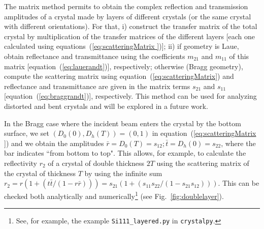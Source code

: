 \documentclass[preprint]{iucr}              %
\newcommand{\todo}[1]{{\color{red}[TODO: "#1'']}}
\newcommand{\inblue}[1]{{\color{blue}#1}}
\newcommand{\inred}[1]{{\color{red}#1}}
\begin{document}

\inblue{
The matrix method permits to obtain the complex reflection and transmission amplitudes of a crystal made by layers of different crystals (or the same crystal with different orientations). For that,
i) construct the transfer matrix of the total crystal by multiplication of the transfer matrices of the different layers [each one calculated using equations~(\ref{eq:scatteringMatrix })];
ii) if geometry is Laue, obtain reflectance and transmittance using the coefficients $m_{21}$ and $m_{11}$ of this matrix [equation~(\ref{eq:lauerandt})], respectively; otherwise (Bragg geometry), compute the scattering matrix using equation~(\ref{eq:scatteringMatrix}) and reflectance and transmittance are given in the matrix terms $s_{21}$ and $s_{11}$ [equation~(\ref{eq:braggrandt})], respectively.   \inred{This method can be used for analyzing distorted and bent crystals and will be explored in a future work}.


In the Bragg case where the incident beam enters the crystal by the bottom surface, we set $(D_0(0),D_h(T))=(0,1)$ in equation~(\ref{eq:scatteringMatrix }) and  we obtain the amplitudes $\bar{r}=D_0(T)=s_{12}; \bar{t}=D_h(0)=s_{22}$, where the bar indicates ``from bottom to top". This allows, for example, to calculate the reflectivity $r_{2}$ of a crystal of double thickness $2 T$ using the scattering matrix of the crystal of thickness $T$
by using the infinite sum $r_2=r(1 + (t \bar{t} / (1-r \bar{r})))=s_{21}(1 + (s_{11} s_{22} / (1-s_{21} s_{12})))$. This can be checked both analytically and numerically\footnote{See, for example, the example {\tt Si111\_layered.py} in {\tt crystalpy}.} (see Fig.~\ref{fig:doublelayer}).
}
\end{document}

